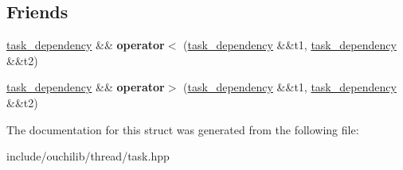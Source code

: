 \subsection*{Friends}
\begin{DoxyCompactItemize}
\item 
\mbox{\label{structouchi_1_1task_1_1taskinfo_1_1task__dependency_a5760380a7c16df57a1fd0f1514873a4f}} 
\mbox{\hyperlink{structouchi_1_1task_1_1taskinfo_1_1task__dependency}{task\+\_\+dependency}} \&\& {\bfseries operator$<$} (\mbox{\hyperlink{structouchi_1_1task_1_1taskinfo_1_1task__dependency}{task\+\_\+dependency}} \&\&t1, \mbox{\hyperlink{structouchi_1_1task_1_1taskinfo_1_1task__dependency}{task\+\_\+dependency}} \&\&t2)
\item 
\mbox{\label{structouchi_1_1task_1_1taskinfo_1_1task__dependency_aecfec083da2b2a9ac35c0c2396736e1f}} 
\mbox{\hyperlink{structouchi_1_1task_1_1taskinfo_1_1task__dependency}{task\+\_\+dependency}} \&\& {\bfseries operator$>$} (\mbox{\hyperlink{structouchi_1_1task_1_1taskinfo_1_1task__dependency}{task\+\_\+dependency}} \&\&t1, \mbox{\hyperlink{structouchi_1_1task_1_1taskinfo_1_1task__dependency}{task\+\_\+dependency}} \&\&t2)
\end{DoxyCompactItemize}


The documentation for this struct was generated from the following file\+:\begin{DoxyCompactItemize}
\item 
include/ouchilib/thread/task.\+hpp\end{DoxyCompactItemize}
